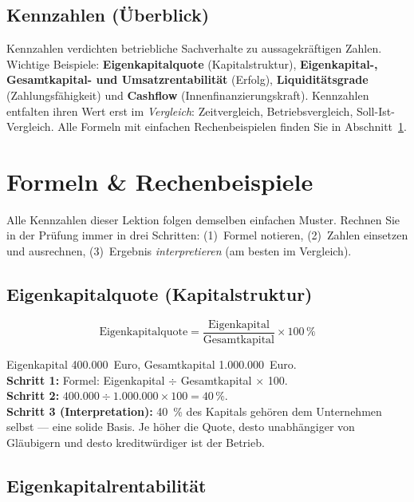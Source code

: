 \documentclass[11pt, a4paper]{article}
\begin{document}
\subsection{Kennzahlen (Überblick)}

Kennzahlen verdichten betriebliche Sachverhalte zu aussagekräftigen Zahlen. Wichtige
Beispiele: \textbf{Eigenkapitalquote} (Kapitalstruktur), \textbf{Eigenkapital-,
Gesamtkapital- und Umsatzrentabilität} (Erfolg), \textbf{Liquiditätsgrade}
(Zahlungsfähigkeit) und \textbf{Cashflow} (Innenfinanzierungskraft). Kennzahlen
entfalten ihren Wert erst im \emph{Vergleich}: Zeitvergleich, Betriebsvergleich,
Soll-Ist-Vergleich. Alle Formeln mit einfachen Rechenbeispielen finden Sie in
Abschnitt~\ref{sec:formeln}.

\section{Formeln \& Rechenbeispiele}\label{sec:formeln}

Alle Kennzahlen dieser Lektion folgen demselben einfachen Muster. Rechnen Sie in der
Prüfung immer in drei Schritten: (1)~Formel notieren, (2)~Zahlen einsetzen und
ausrechnen, (3)~Ergebnis \emph{interpretieren} (am besten im Vergleich).

\subsection{Eigenkapitalquote (Kapitalstruktur)}

\[
\mbox{Eigenkapitalquote} = \frac{\mbox{Eigenkapital}}{\mbox{Gesamtkapital}} \times 100\,\%
\]

\begin{beispiel}[title={Beispiel: Eigenkapitalquote}]
Eigenkapital 400.000~Euro, Gesamtkapital 1.000.000~Euro.\\
\textbf{Schritt 1:} Formel: Eigenkapital $\div$ Gesamtkapital $\times$ 100.\\
\textbf{Schritt 2:} $400.000 \div 1.000.000 \times 100 = 40\,\%$.\\
\textbf{Schritt 3 (Interpretation):} 40~\% des Kapitals gehören dem Unternehmen selbst
--- eine solide Basis. Je höher die Quote, desto unabhängiger von Gläubigern und desto
kreditwürdiger ist der Betrieb.
\end{beispiel}

\subsection{Eigenkapitalrentabilität}
\end{document}
